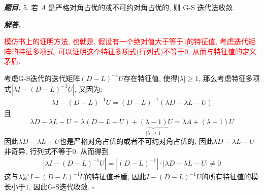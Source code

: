 \documentclass[10pt, a4paper, oneside]{ctexart}
\newenvironment{problem}{\begin{framed}\par\noindent\textbf{\textit{题目. }}}{\end{framed}\par}
\newenvironment{solution}{%
  \par\noindent\textbf{\textit{解答. }}\ignorespaces
}{%
  \hfill\ensuremath{\square}\par %
}
\begin{document}
\begin{problem}
    5. 若 $A$ 是严格对角占优的或不可约对角占优的, 则 G-S 迭代法收敛.
\end{problem}
\begin{solution}
\textcolor{red}{模仿书上的证明方法, 也就是, 假设有一个绝对值大于等于$1$的特征值, 考虑迭代矩阵的特征多项式, 可以证明这个特征多项式(行列式)不等于$0$, 从而与特征值的定义矛盾}.

考虑G-S迭代的迭代矩阵$(D-L)^{-1}U$存在特征值, 使得$|\lambda|\geq 1$, 那么考虑特征多项式$|\lambda I -(D-L)^{-1}U |$, 又因为:
\begin{align*}
    \lambda I-(D-L)^{-1}U=(D-L)^{-1}(\lambda D-\lambda L -U)
\end{align*}
且 
$$\lambda D-\lambda L -U=\lambda(D-L-U)+\underbrace{(\lambda-1)}_{|\lambda|\geq 1}U=\lambda A+(\lambda-1)U$$
因此$\lambda D-\lambda L -U$也是严格对角占优的或者不可约对角占优的, 因此$\lambda D-\lambda L -U$非奇异, 行列式不等于$0$. 从而得到 
\begin{align*}
    |\lambda I-(D-L)^{-1}U|
    =|(D-L)^{-1}|\cdot|\lambda D-\lambda L -U|\neq 0
\end{align*}
这与$\lambda$是$I-(D-L)^{-1}U$的特征值矛盾, 因此$I-(D-L)^{-1}U$的所有特征值的模长小于$1$, 因此G-S迭代收敛.
\end{solution}
\end{document}
